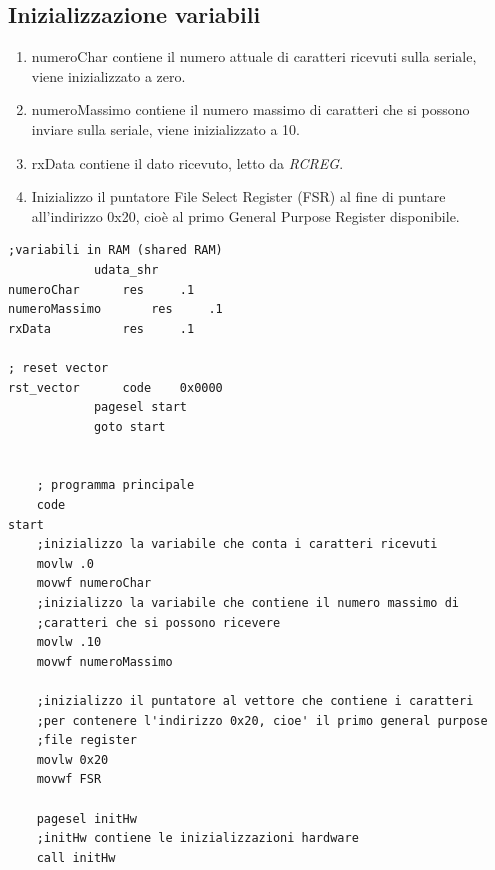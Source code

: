 \documentclass{article}
\begin{document}
	\subsection{Inizializzazione variabili}
	\begin{enumerate}
		\item numeroChar contiene il numero attuale di caratteri ricevuti sulla seriale, viene inizializzato a zero.
		\item numeroMassimo contiene il numero massimo di caratteri che si possono inviare sulla seriale, viene inizializzato a 10.
		\item rxData contiene il dato ricevuto, letto da \emph{RCREG}.
		\item Inizializzo il puntatore File Select Register (FSR) al fine di puntare all'indirizzo 0x20, cioè al primo General Purpose Register disponibile.
	\end{enumerate}
	
	\begin{lstlisting}[frame=single]
;variabili in RAM (shared RAM)
			udata_shr
numeroChar		res		.1 
numeroMassimo		res		.1
rxData			res		.1

; reset vector
rst_vector		code	0x0000
			pagesel start
			goto start
		
	
	; programma principale
	code
start
	;inizializzo la variabile che conta i caratteri ricevuti
	movlw .0
	movwf numeroChar
	;inizializzo la variabile che contiene il numero massimo di 
	;caratteri che si possono ricevere
	movlw .10
	movwf numeroMassimo
	
	;inizializzo il puntatore al vettore che contiene i caratteri
	;per contenere l'indirizzo 0x20, cioe' il primo general purpose
	;file register
	movlw 0x20 
	movwf FSR
	
	pagesel initHw
	;initHw contiene le inizializzazioni hardware
	call initHw  
	\end{lstlisting}
	
\end{document}
